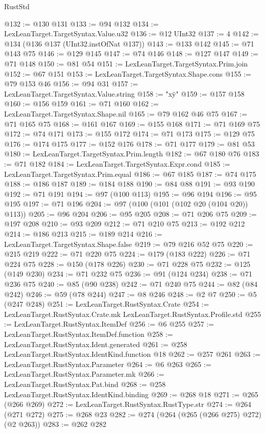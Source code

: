 \begin{lexlean}{RustStd}
\begin{coremodule}
@132 := @130 @131
@133 := @94 @132
@134 := LexLeanTarget.TargetSyntax.Value.u32
@136 := @12 UInt32
@137 := 4
@142 := @134 (@136 @137 (UInt32.instOfNat @137))
@143 := @133 @142
@145 := @71 @143 @75
@146 := @129 @145
@147 := @74 @146
@148 := @127 @147
@149 := @71 @148
@150 := @81 @54
@151 := LexLeanTarget.TargetSyntax.Prim.join
@152 := @67 @151
@153 := LexLeanTarget.TargetSyntax.Shape.cons
@155 := @79 @153 @46
@156 := @94 @31
@157 := LexLeanTarget.TargetSyntax.Value.string
@158 := "x\"y"
@159 := @157 @158
@160 := @156 @159
@161 := @71 @160
@162 := LexLeanTarget.TargetSyntax.Shape.nil
@165 := @79 @162 @46 @75
@167 := @71 @165 @75
@168 := @161 @167
@169 := @155 @168
@171 := @71 @169 @75
@172 := @74 @171
@173 := @155 @172
@174 := @71 @173
@175 := @129 @75
@176 := @174 @175
@177 := @152 @176
@178 := @71 @177
@179 := @81 @53
@180 := LexLeanTarget.TargetSyntax.Prim.length
@182 := @67 @180 @76
@183 := @71 @182
@184 := LexLeanTarget.TargetSyntax.Expr.cond
@185 := LexLeanTarget.TargetSyntax.Prim.equal
@186 := @67 @185
@187 := @74 @175
@188 := @186 @187
@189 := @184 @188
@190 := @84 @88
@191 := @93 @190
@192 := @71 @191
@194 := @97 (@100 @113)
@195 := @96 @194
@196 := @95 @195
@197 := @71 @196
@204 := @97 (@100 (@101 (@102 @20 (@104 @20)) @113))
@205 := @96 @204
@206 := @95 @205
@208 := @71 @206 @75
@209 := @197 @208
@210 := @93 @209
@212 := @71 @210 @75
@213 := @192 @212
@214 := @186 @213
@215 := @189 @214
@216 := LexLeanTarget.TargetSyntax.Shape.false
@219 := @79 @216 @52 @75
@220 := @215 @219
@222 := @71 @220 @75
@224 := @179 (@183 @222)
@226 := @71 @224 @75
@228 := @150 (@178 @226)
@230 := @71 @228 @75
@232 := @125 (@149 @230)
@234 := @71 @232 @75
@236 := @91 (@124 @234)
@238 := @71 @236 @75
@240 := @85 (@90 @238)
@242 := @71 @240 @75
@244 := @82 (@84 @242)
@246 := @59 (@78 @244)
@247 := @8 @246
@248 := @2 @7
@250 := @5 (@247 @248)
@251 := LexLeanTarget.RustSyntax.Crate
@254 := LexLeanTarget.RustSyntax.Crate.mk LexLeanTarget.RustSyntax.Profile.std
@255 := LexLeanTarget.RustSyntax.ItemDef
@256 := @6 @255
@257 := LexLeanTarget.RustSyntax.ItemDef.function
@258 := LexLeanTarget.RustSyntax.Ident.generated
@261 := @258 LexLeanTarget.RustSyntax.IdentKind.function @18
@262 := @257 @261
@263 := LexLeanTarget.RustSyntax.Parameter
@264 := @6 @263
@265 := LexLeanTarget.RustSyntax.Parameter.mk
@266 := LexLeanTarget.RustSyntax.Pat.bind
@268 := @258 LexLeanTarget.RustSyntax.IdentKind.binding
@269 := @268 @18
@271 := @265 (@266 @269)
@272 := LexLeanTarget.RustSyntax.RustType.str
@274 := @264 (@271 @272)
@275 := @268 @23
@282 := @274 (@264 (@265 (@266 @275) @272) (@2 @263))
@283 := @262 @282

\end{coremodule}
\end{lexlean}
